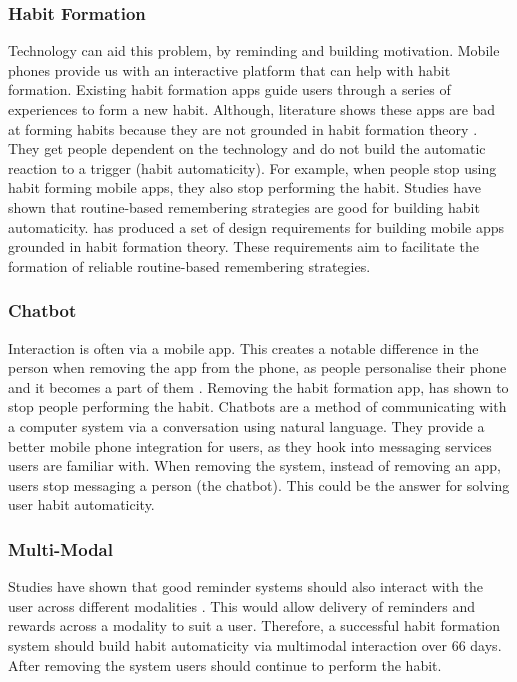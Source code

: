 \subsubsection*{Habit Formation}
Technology can aid this problem, by reminding and building motivation. Mobile phones provide us with an interactive platform that can help with habit formation. Existing habit formation apps guide users through a series of experiences to form a new habit. Although, literature shows these apps are bad at forming habits because they are not grounded in habit formation theory \cite{article_beyond_self_tracking_designing_apps}. They get people dependent on the technology and do not build the automatic reaction to a trigger (habit automaticity). For example, when people stop using habit forming mobile apps, they also stop performing the habit.\newline
\newline
Studies have shown that routine-based remembering strategies are good for building habit automaticity. \cite{article_dont_forget_your_pill} has produced a set of design requirements for building mobile apps grounded in habit formation theory. These requirements aim to facilitate the formation of reliable routine-based remembering strategies.

\subsubsection*{Chatbot}
Interaction is often via a mobile app. This creates a notable difference in the person when removing the app from the phone, as people personalise their phone and it becomes a part of them \cite{article_my_phone_is_part_of_my_soul}. Removing the habit formation app, has shown to stop people performing the habit. Chatbots are a method of communicating with a computer system via a conversation using natural language. They provide a better mobile phone integration for users, as they hook into messaging services users are familiar with. When removing the system, instead of removing an app, users stop messaging a person (the chatbot). This could be the answer for solving user habit automaticity.

\subsubsection*{Multi-Modal}
Studies have shown that good reminder systems should also interact with the user across different modalities \cite{article_designing_multimodal_reminders_for_home} . This would allow delivery of reminders and rewards across a modality to suit a user.\newline
\newline
Therefore, a successful habit formation system should build habit automaticity via multimodal interaction over 66 days. After removing the system users should continue to perform the habit.

